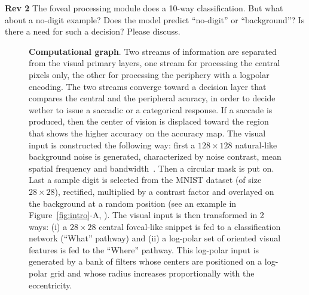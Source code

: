 {\color{red} \textbf{Rev 2} The foveal processing module does a 10-way classification. But what about a no-digit example? Does the model predict “no-digit” or “background”? Is there a need for such a decision? Please discuss. 
}


\begin{figure}[t!]%
	\caption{%
		{\bf Computational graph}. Two streams of information are separated from the visual primary layers, one stream for processing the central pixels only, the other for processing the periphery with a logpolar encoding. The two streams converge toward a decision layer that compares the central and the peripheral acuracy, in order to decide wether to issue a saccadic or a categorical response. If a saccade is produced, then the center of vision is displaced toward the region that shows the higher accuracy on the accuracy map.
		\A The visual input is constructed the following way: first a  $128\times 128$  natural-like background noise is generated, characterized by noise contrast, mean spatial frequency and bandwidth~\cite{Sanz12}. Then a circular mask is put on. Last a sample digit is selected from the MNIST dataset (of size $28\times 28$), rectified, multiplied by a contrast factor and overlayed on the background at a random position (see an example in Figure~\ref{fig:intro}-A, \DIS ). %
		\B The visual input is then transformed in 2 ways: (i) a $28\times 28$ central foveal-like snippet is fed to a classification network (``What'' pathway) and (ii) a log-polar set of oriented visual features is fed to the ``Where'' pathway. This log-polar input is generated by a bank of filters whose centers are positioned on a log-polar grid and whose radius increases proportionally with the eccentricity. %
		\C 
}
\end{figure}
